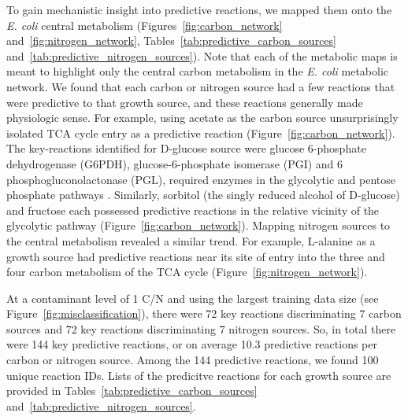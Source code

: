 \documentclass[12pt]{article}
\begin{document}
To gain mechanistic insight into predictive reactions, we mapped them onto the \emph{E. coli} central metabolism (Figures~\ref{fig:carbon_network} and~\ref{fig:nitrogen_network}, Tables~\ref{tab:predictive_carbon_sources} and~\ref{tab:predictive_nitrogen_sources}). Note that each of the metabolic maps is meant to highlight only the central carbon metabolism in the \emph{E. coli} metabolic network. We found that each carbon or nitrogen source had a few reactions that were predictive to that growth source, and these reactions generally made physiologic sense. For example, using acetate as the carbon source unsurprisingly isolated TCA cycle entry as a predictive reaction (Figure~\ref{fig:carbon_network}). The key-reactions identified for D-glucose source were glucose 6-phosphate dehydrogenase (G6PDH), glucose-6-phosphate isomerase (PGI) and 6 phosphogluconolactonase (PGL), required enzymes in the glycolytic and pentose phosphate pathways \cite{KuporFraenkel1972}. Similarly, sorbitol (the singly reduced alcohol of D-glucose) and fructose each possessed predictive reactions in the relative vicinity of the glycolytic pathway (Figure~\ref{fig:carbon_network}). Mapping nitrogen sources to the central metabolism revealed a similar trend. For example, L-alanine as a growth source had predictive reactions near its site of entry into the three and four carbon metabolism of the TCA cycle (Figure~\ref{fig:nitrogen_network}).

At a contaminant level of 1 C/N and using the largest training data size (see Figure~\ref{fig:misclassification}), there were 72 key reactions discriminating 7 carbon sources and 72 key reactions discriminating 7 nitrogen sources. So, in total there were 144 key predictive reactions, or on average 10.3 predictive reactions per carbon or nitrogen source. Among the 144 predictive reactions, we found 100 unique reaction IDs. Lists of the predicitve reactions for each growth source are provided in Tables~\ref{tab:predictive_carbon_sources} and~\ref{tab:predictive_nitrogen_sources}.
\end{document}
